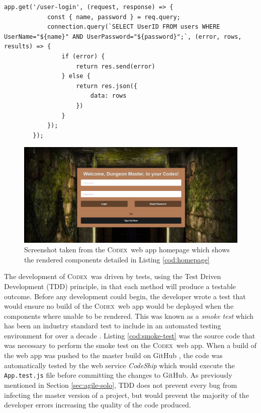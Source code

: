 \documentclass[final]{cmpreport}
\newcommand{\Codex}{\textsc{Codex}}
\begin{document}
		\begin{lstlisting}[caption={Source code for querying the Database with User Information}, label={cod:server-query}]
		app.get('/user-login', (request, response) => {
			const { name, password } = req.query;
			connection.query(`SELECT UserID FROM users WHERE UserName="${name}" AND UserPassword="${password}";`, (error, rows, results) => {
				if (error) {
					return res.send(error)
				} else {
					return res.json({
						data: rows
					})
				}
			});
		});
		\end{lstlisting}
		
		\begin{figure}
			\centering
			\includegraphics[width=0.8\linewidth]{homepage-developed.png}
			\caption[Screenshot of the \Codex \ web app]{Screenshot taken from the \Codex \ web app homepage which shows the rendered components detailed in Listing \ref{cod:homepage}} \label{fig:homepage}
		\end{figure}
	
		The development of \Codex \ was driven by tests, using the Test Driven Development (TDD) principle, in that each method will produce a testable outcome. Before any development could begin, the developer wrote a test that would ensure no build of the \Codex \ web app would be deployed when the components where unable to be rendered. This was known as a \emph{smoke test} which has been an industry standard test to include in an automated testing environment for over a decade \citep{testing}. Listing \ref{cod:smoke-test} was the source code that was necessary to perform the smoke test on the \Codex \ web app. When a build of the web app was pushed to the master build on GitHub \citep{github}, the code was automatically tested by the web service \emph{CodeShip} \citep{codeship} which would execute the \texttt{App.test.js} file before committing the changes to GitHub. As previously mentioned in Section \ref{sec:agile-solo}, TDD does not prevent every bug from infecting the master version of a project, but would prevent the majority of the developer errors increasing the quality of the code produced.
		
\end{document}
